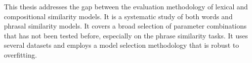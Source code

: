 This thesis addresses the gap between the evaluation methodology of lexical and compositional similarity models. It is a systematic study of both words and phrasal similarity models. It covers a broad selection of parameter combinations that has not been tested before, especially on the phrase similarity tasks. It uses several datasets and employs a model selection methodology that is robust to overfitting.

